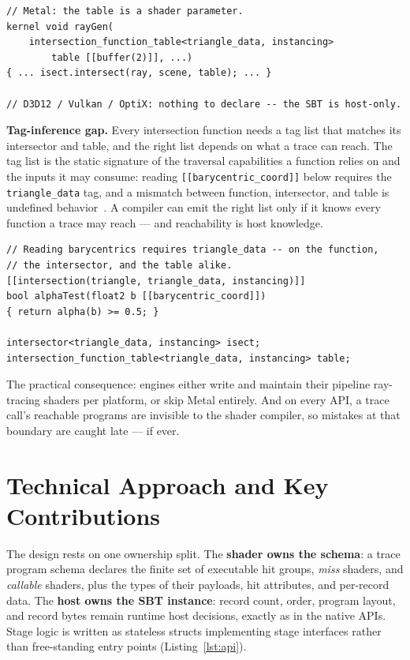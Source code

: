 \documentclass[sigconf,nonacm]{acmart}
\begin{document}
\begin{lstlisting}
// Metal: the table is a shader parameter.
kernel void rayGen(
    intersection_function_table<triangle_data, instancing>
        table [[buffer(2)]], ...)
{ ... isect.intersect(ray, scene, table); ... }

// D3D12 / Vulkan / OptiX: nothing to declare -- the SBT is host-only.
\end{lstlisting}

\textbf{Tag-inference gap.} Every intersection function needs a tag
list that matches its intersector and table, and the right list depends
on what a trace can reach. The tag list is the static signature of the
traversal capabilities a function relies on and the inputs it may
consume: reading \texttt{[[barycentric\_coord]]} below requires the
\texttt{triangle\_data} tag, and a mismatch between function,
intersector, and table is undefined behavior~\cite[\S\S2.17.1, 5.1.6,
2.17.6]{msl-spec}. A compiler can emit the right list only if it knows
every function a trace may reach --- and reachability is host knowledge.

\begin{lstlisting}
// Reading barycentrics requires triangle_data -- on the function,
// the intersector, and the table alike.
[[intersection(triangle, triangle_data, instancing)]]
bool alphaTest(float2 b [[barycentric_coord]])
{ return alpha(b) >= 0.5; }

intersector<triangle_data, instancing> isect;
intersection_function_table<triangle_data, instancing> table;
\end{lstlisting}

The practical consequence: engines either write and maintain their
pipeline ray-tracing shaders per platform, or skip Metal entirely. And
on every API, a trace call's reachable programs are invisible to the
shader compiler, so mistakes at that boundary are caught late --- if
ever.

\section{Technical Approach and Key Contributions}

The design rests on one ownership split. The \textbf{shader owns the
schema}: a trace program schema declares the finite set of executable
hit groups, \emph{miss} shaders, and \emph{callable} shaders, plus the
types of their
payloads, hit attributes, and per-record data. The \textbf{host owns the
SBT instance}: record count, order, program layout, and record bytes
remain runtime host decisions, exactly as in the native APIs. Stage
logic is written as stateless structs implementing stage interfaces
rather than free-standing entry points (Listing~\ref{lst:api}).
\end{document}
